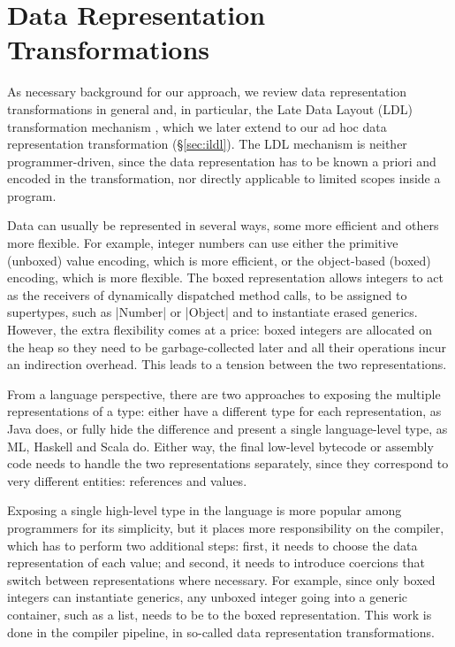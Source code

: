 \section{Data Representation Transformations}
\label{sec:drt}

As necessary background for our approach, we review data representation transformations in general and, in particular, the Late Data Layout (LDL) transformation mechanism \cite{ldl}, which we later extend to our ad hoc data representation transformation (\S\ref{sec:ildl}). The LDL mechanism is neither programmer-driven, since the data representation has to be known a priori and encoded in the transformation, nor directly applicable to limited scopes inside a program.


Data can usually be represented in several ways, some more efficient and others more flexible. For example, integer numbers can use either the primitive (unboxed) value encoding, which is more efficient, or the object-based (boxed) encoding, which is more flexible. The boxed representation allows integers to act as the receivers of dynamically dispatched method calls, to be assigned to supertypes, such as |Number| or |Object| and to instantiate erased generics. However, the extra flexibility comes at a price: boxed integers are allocated on the heap so they need to be garbage-collected later and all their operations incur an indirection overhead. This leads to a tension between the two representations.

From a language perspective, there are two approaches to exposing the multiple representations of a type: either have a different
type for each representation, as Java does, or fully hide the difference and present a single language-level type, as ML, Haskell and Scala do. Either way, the final low-level bytecode or assembly code needs to handle the two representations separately, since they correspond to very different entities: references and values.

Exposing a single high-level type in the language is more popular among programmers for its simplicity, but it places more responsibility on the compiler, which has to perform two additional steps: first, it needs to choose the data representation of each value; and second, it needs to introduce coercions that switch between representations where necessary. For example, since only boxed integers can instantiate generics, any unboxed integer going into a generic container, such as a list, needs to be  to the boxed representation. This work is done in the compiler pipeline, in so-called data representation transformations.

